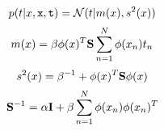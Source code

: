$$p(t|x,{\tt x},{\tt t})={\cal N}(t|m(x),s^2 (x))$$
$$m(x)=\beta \phi (x)^T {\bf S}\sum_{n=1}^{N}\phi (x_n)t_n$$
$$s^2 (x) = \beta ^{-1} + \phi (x)^T {\bf S} \phi (x)$$
$${\bf S}^{-1} = \alpha {\bf I} + \beta \sum_{n=1}^{N}\phi(x_n)\phi(x_n)^T$$
